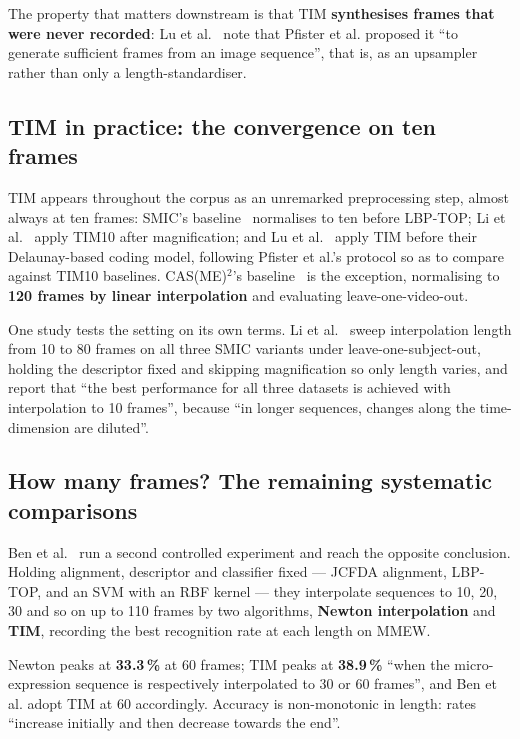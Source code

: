 The property that matters downstream is that TIM \textbf{synthesises frames that were never recorded}: Lu et al.~\cite{lu2015} note that Pfister et al. proposed it ``to generate sufficient frames from an image sequence'', that is, as an upsampler rather than only a length-standardiser.

\subsection{TIM in practice: the convergence on ten frames}
\label{sec:tim-ten-frames}

TIM appears throughout the corpus as an unremarked preprocessing step, almost always at ten frames: SMIC's baseline~\cite{liX2013} normalises to ten before LBP-TOP; Li et al.~\cite{liX2018} apply TIM10 after magnification; and Lu et al.~\cite{lu2015} apply TIM before their Delaunay-based coding model, following Pfister et al.'s protocol so as to compare against TIM10 baselines. CAS(ME)$^2$'s baseline~\cite{qu2016} is the exception, normalising to \textbf{120 frames by linear interpolation} and evaluating leave-one-video-out.

One study tests the setting on its own terms. Li et al.~\cite{liX2018} sweep interpolation length from 10 to 80 frames on all three SMIC variants under leave-one-subject-out, holding the descriptor fixed and skipping magnification so only length varies, and report that ``the best performance for all three datasets is achieved with interpolation to 10 frames'', because ``in longer sequences, changes along the time-dimension are diluted''.

\subsection{How many frames? The remaining systematic comparisons}
\label{sec:tim-how-many}

Ben et al.~\cite{ben2021} run a second controlled experiment and reach the opposite conclusion. Holding alignment, descriptor and classifier fixed --- JCFDA alignment, LBP-TOP, and an SVM with an RBF kernel --- they interpolate sequences to 10, 20, 30 and so on up to 110 frames by two algorithms, \textbf{Newton interpolation} and \textbf{TIM}, recording the best recognition rate at each length on MMEW.

Newton peaks at \textbf{33.3\,\%} at 60 frames; TIM peaks at \textbf{38.9\,\%} ``when the micro-expression sequence is respectively interpolated to 30 or 60 frames'', and Ben et al. adopt TIM at 60 accordingly. Accuracy is non-monotonic in length: rates ``increase initially and then decrease towards the end''.

